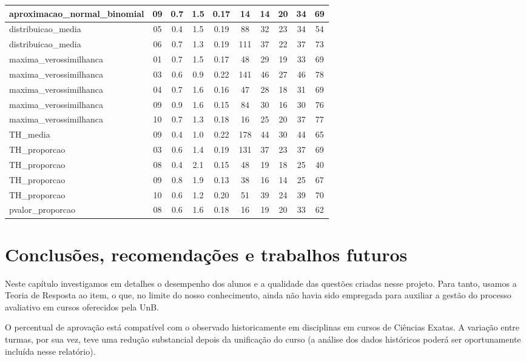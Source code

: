 \documentclass[a4paper]{report}
\begin{document}
\begin{longtable}{l|c|c|c|c|c|c|c|c|c}
\hline
aproximacao\_normal\_binomial & 09 & 0.7 & 1.5 & 0.17 & 14 & 14 & 20 & 34 & 69\\
\hline
distribuicao\_media & 05 & 0.4 & 1.5 & 0.19 & 88 & 32 & 23 & 34 & 54\\
\hline
distribuicao\_media & 06 & 0.7 & 1.3 & 0.19 & 111 & 37 & 22 & 37 & 73\\
\hline
maxima\_verossimilhanca & 01 & 0.7 & 1.5 & 0.17 & 48 & 29 & 19 & 33 & 69\\
\hline
maxima\_verossimilhanca & 03 & 0.6 & 0.9 & 0.22 & 141 & 46 & 27 & 46 & 78\\
\hline
maxima\_verossimilhanca & 04 & 0.7 & 1.6 & 0.16 & 47 & 28 & 18 & 31 & 69\\
\hline
maxima\_verossimilhanca & 09 & 0.9 & 1.6 & 0.15 & 84 & 30 & 16 & 30 & 76\\
\hline
maxima\_verossimilhanca & 10 & 0.7 & 1.3 & 0.18 & 16 & 25 & 20 & 37 & 77\\
\hline
TH\_media & 09 & 0.4 & 1.0 & 0.22 & 178 & 44 & 30 & 44 & 65\\
\hline
TH\_proporcao & 03 & 0.6 & 1.4 & 0.19 & 131 & 37 & 23 & 37 & 69\\
\hline
TH\_proporcao & 08 & 0.4 & 2.1 & 0.15 & 48 & 19 & 18 & 25 & 40\\
\hline
TH\_proporcao & 09 & 0.8 & 1.9 & 0.13 & 38 & 16 & 14 & 25 & 67\\
\hline
TH\_proporcao & 10 & 0.6 & 1.2 & 0.20 & 51 & 39 & 24 & 39 & 70\\
\hline
pvalor\_proporcao & 08 & 0.6 & 1.6 & 0.18 & 16 & 19 & 20 & 33 & 62\\
\hline
\end{longtable}

\section{Conclusões, recomendações e trabalhos futuros} \label{sec:conclusao}

Neste capítulo investigamos em detalhes o desempenho dos alunos e a
qualidade das questões criadas nesse projeto. Para tanto, usamos a
Teoria de Resposta ao item, o que, no limite do nosso conhecimento,
ainda não havia sido empregada para auxiliar a gestão do processo
avaliativo em cursos oferecidos pela UnB.

O percentual de aprovação está compatível com o observado historicamente
em disciplinas em cursos de Ciências Exatas. A variação entre turmas,
por sua vez, teve uma redução substancial depois da unificação do curso
(a análise dos dados históricos poderá ser oportunamente incluída nesse
relatório).
\end{document}
